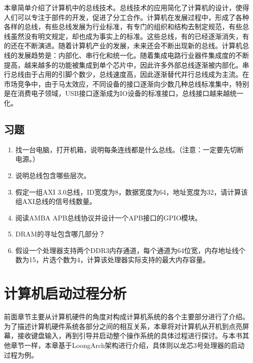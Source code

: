 \documentclass[]{ctexbook}
\providecommand{\tightlist}{%
  \setlength{\itemsep}{0pt}\setlength{\parskip}{0pt}}
\begin{document}
本章简单介绍了计算机中的总线技术。总线技术的应用简化了计算机的设计，使得人们可以专注于部件的开发，促进了分工合作。计算机在发展过程中，形成了各种各样的总线，有些总线发展为行业标准，有专门的组织和结构去制定规范，有些总线虽然没有明文规定，却也成为事实上的标准。这些总线，有的已经逐渐消失，有的还在不断演进。随着计算机产业的发展，未来还会不断出现新的总线。计算机总线的发展趋势是：内部化、串行化和统一化。随着集成电路行业器件集成度的不断提高，越来越多的功能被集成到单个芯片中，因此许多外部总线逐渐被内部化。串行总线由于占用的引脚个数少，总线速度高，因此逐渐替代并行总线成为主流。在市场竞争中，由于马太效应，不同设备的接口逐渐向少数几种总线标准集中，特别是在消费电子领域，USB接口逐渐成为IO设备的标准接口，总线接口越来越统一化。

\hypertarget{ux4e60ux9898-5}{%
\section{习题}\label{ux4e60ux9898-5}}

\begin{enumerate}
\def\labelenumi{\arabic{enumi}.}
\tightlist
\item
  找一台电脑，打开机箱，说明每条连线都是什么总线。（注意：一定要先切断电源。）
\item
  说明总线包含哪些层次。
\item
  假定一组AXI 3.0总线，ID宽度为8，数据宽度为64，地址宽度为32，请计算该组AXI总线的信号线数量。
\item
  阅读AMBA APB总线协议并设计一个APB接口的GPIO模块。
\item
  DRAM的寻址包含哪几部分？
\item
  假设一个处理器支持两个DDR3内存通道，每个通道为64位宽，内存地址线个数为15，片选个数为4，计算该处理器实际支持的最大内存容量。
\end{enumerate}

\newpage

\hypertarget{ux8ba1ux7b97ux673aux542fux52a8ux8fc7ux7a0bux5206ux6790}{%
\chapter{计算机启动过程分析}\label{ux8ba1ux7b97ux673aux542fux52a8ux8fc7ux7a0bux5206ux6790}}

前面章节主要从计算机硬件的角度对构成计算机系统的各个主要部分进行了介绍。为了描述计算机硬件系统各部分之间的相互关系，本章将对计算机从开机到点亮屏幕，接收键盘输入，再到引导并启动整个操作系统的具体过程进行探讨。与本书其他章节一样，本章基于LoongArch架构进行介绍，具体则以龙芯3号处理器的启动过程为例。
\end{document}
